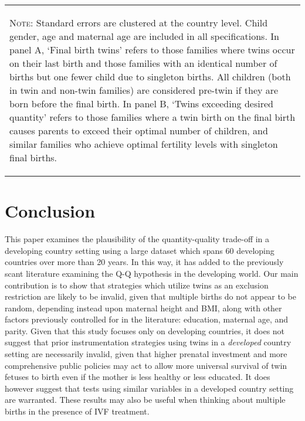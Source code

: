 \documentclass{article}[11pt,subeqn]
\begin{document}
\begin{spacing}{1.5}
\begin{table}
\begin{center}
\begin{tabular}{lcccc}
\bottomrule									
\multicolumn{5}{p{15cm}}{\setstretch{0.9}\begin{footnotesize}\textsc{Note:} Standard errors are clustered at the country level.  Child gender, age and maternal age are included
in all specifications.  In panel A, `Final birth twins' refers to those families where twins occur on their last birth and those families with an identical number of births but one 
fewer child due to singleton births.  All children (both in twin and non-twin families) are considered pre-twin if they are born before the final birth.  In panel B, `Twins
exceeding desired quantity' refers to those families where a twin birth on the final birth causes parents to exceed their optimal number of children, and similar families who
achieve optimal fertility levels with singleton final births. \end{footnotesize}}\\								
\end{tabular}									
\end{center}									
\end{table}									


\section{Conclusion}
\label{scn:conclusion}
This paper examines the plausibility of the quantity-quality trade-off in a developing country setting using a large dataset which spans 60 developing countries over more than 20 
years.  In this way, it has added to the previously scant literature examining the Q-Q hypothesis in the developing world.  Our main contribution is to show that strategies 
which utilize twins as an exclusion restriction are likely to be invalid, given that multiple births do not appear to be random, depending instead upon maternal height and 
BMI, along with other factors previously controlled for in the literature: education, maternal age, and parity.  Given that this study focuses only on developing countries, 
it does not suggest that prior instrumentation strategies using twins in a \emph{developed} country setting are necessarily invalid, given that higher prenatal investment 
and more comprehensive public policies may act to allow more universal survival of twin fetuses to birth even if the mother is less healthy or less educated.  It does however 
suggest that tests using similar variables in a developed country setting are warranted.  These results may also  be useful when thinking about multiple births in the presence 
of IVF treatment.


\end{spacing}
\end{document}
